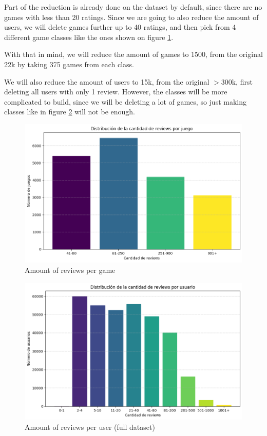 \documentclass{article}
\begin{document}
Part of the reduction is already done on the dataset by default, since there are no games with less than 20 ratings. Since we are going to also reduce the amount of users, we will delete games further up to 40 ratings, and then pick from 4 different game classes like the ones shown on figure \ref{fig:reviewsPorJuego}.

With that in mind, we will reduce the amount of games to 1500, from the original 22k by taking 375 games from each class.

We will also reduce the amount of users to 15k, from the original $>$300k, first deleting all users with only 1 review. However, the classes will be more complicated to build, since we will be deleting a lot of games, so just making classes like in figure \ref{fig:reviewsPorUsuario} will not be enough.

\begin{figure}[h]
    \centering
    \includegraphics[width=0.9\linewidth]{ReviewsPorJuego.png}
    \caption{Amount of reviews per game}
    \label{fig:reviewsPorJuego}
\end{figure}

\begin{figure}[h]
    \centering
    \includegraphics[width=0.9\linewidth]{reviewsPorUsuario.png}
    \caption{Amount of reviews per user (full dataset)}
    \label{fig:reviewsPorUsuario}
\end{figure}
\end{document}
